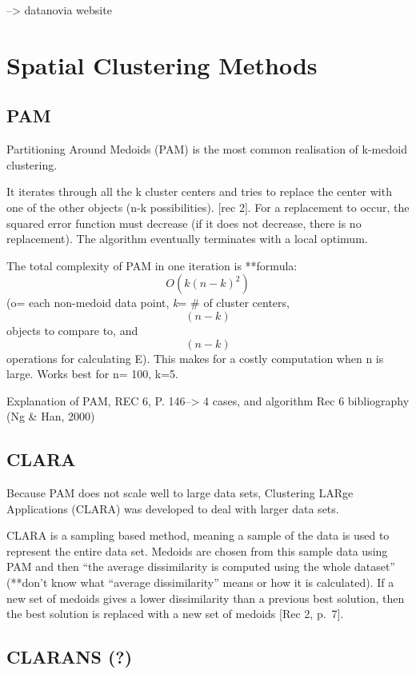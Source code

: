 \documentclass[12pt,twoside]{amherstthesis}
\begin{document}
  --\textgreater{} datanovia website
  
  \chapter{Spatial Clustering Methods}\label{typeset-equ}
  
  \section{PAM}\label{pam}
  
  Partitioning Around Medoids (PAM) is the most common realisation of
  k-medoid clustering.
  
  It iterates through all the k cluster centers and tries to replace the
  center with one of the other objects (n-k possibilities). {[}rec 2{]}.
  For a replacement to occur, the squared error function must decrease (if
  it does not decrease, there is no replacement). The algorithm eventually
  terminates with a local optimum.
  
  The total complexity of PAM in one iteration is **formula:
  \[O(k(n-k)^2)\] (o= each non-medoid data point, \emph{k}= \# of cluster
  centers, \[(n-k)\] objects to compare to, and \[(n-k)\] operations for
  calculating E). This makes for a costly computation when n is large.
  Works best for n= 100, k=5.
  
  Explanation of PAM, REC 6, P. 146--\textgreater{} 4 cases, and algorithm
  Rec 6 bibliography (Ng \& Han, 2000)
  
  \section{CLARA}\label{clara}
  
  Because PAM does not scale well to large data sets, Clustering LARge
  Applications (CLARA) was developed to deal with larger data sets.
  
  CLARA is a sampling based method, meaning a sample of the data is used
  to represent the entire data set. Medoids are chosen from this sample
  data using PAM and then ``the average dissimilarity is computed using
  the whole dataset'' (**don't know what ``average dissimilarity'' means
  or how it is calculated). If a new set of medoids gives a lower
  dissimilarity than a previous best solution, then the best solution is
  replaced with a new set of medoids {[}Rec 2, p.~7{]}.
  
  \section{CLARANS (?)}\label{clarans}
  
\end{document}
